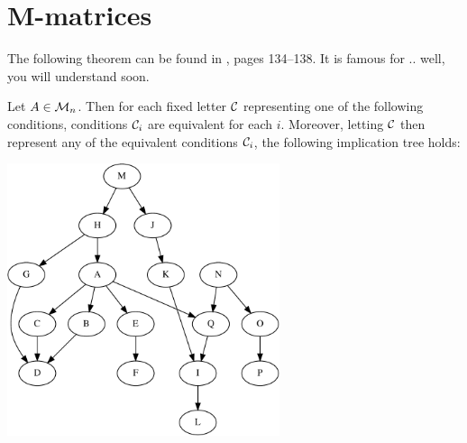 \documentclass[aspectratio=169]{beamer}
\begin{document}
\section{M-matrices}
\begin{frame}
The following theorem can be found in \cite{BermanPlemmons1994}, pages 134--138.
It is famous for .. well, you will understand soon.

\begin{theorem}
Let $A\in\mathcal{M}_n$. Then for each fixed letter $\mathcal{C}$ representing one of the following conditions, conditions $\mathcal{C}_i$ are equivalent for each $i$. Moreover, letting $\mathcal{C}$ then represent any of the equivalent conditions $\mathcal{C}_i$, the following implication tree holds:
\begin{center}
	\includegraphics[width=0.6\textwidth]{BermanPlemmons_fig}
\end{center}


\end{theorem}
\end{frame}
\end{document}
